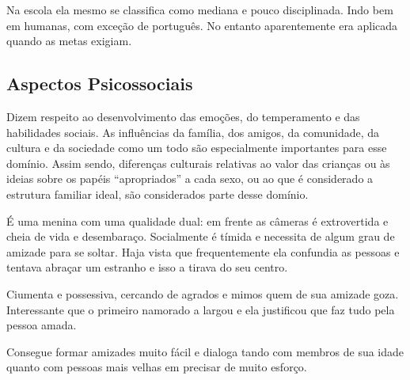 Na escola ela mesmo se classifica como mediana e pouco disciplinada. Indo bem em humanas, com exceção de português. No entanto aparentemente era aplicada quando as metas exigiam.

\subsection{Aspectos Psicossociais}

Dizem respeito ao desenvolvimento das emoções, do temperamento e das habilidades sociais. As influências da família, dos amigos, da comunidade, da cultura e da sociedade como um todo são especialmente importantes para esse domínio. Assim sendo, diferenças culturais relativas ao valor das crianças ou às ideias sobre os papéis “apropriados” a cada sexo, ou ao que é considerado a estrutura familiar ideal, são considerados parte desse domínio.

É uma menina com uma qualidade dual: em frente as câmeras é extrovertida e cheia de vida e desembaraço. Socialmente é tímida e necessita de algum grau de amizade para se soltar. Haja vista que frequentemente ela confundia as pessoas e tentava abraçar um estranho e isso a tirava do seu centro.

Ciumenta e possessiva, cercando de agrados e mimos quem de sua amizade goza. Interessante que o primeiro namorado a largou e ela justificou que faz tudo pela pessoa amada.

Consegue formar amizades muito fácil e dialoga tando com membros de sua idade quanto com pessoas mais velhas em precisar de muito esforço.




